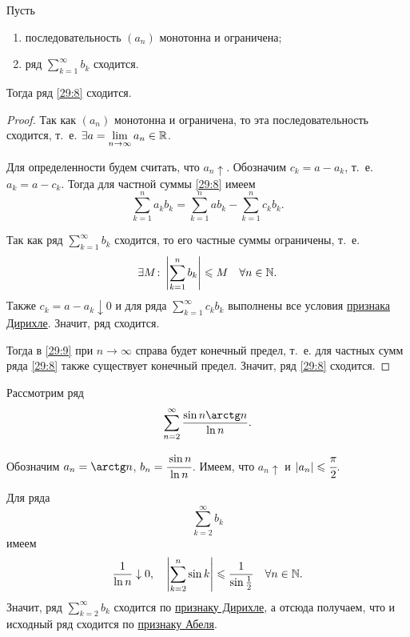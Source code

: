 \documentclass[../../main.tex]{subfiles}
\begin{document}
	\begin{thm}
		\label{29:abel}
		Пусть
		\begin{enumerate}
			\item последовательность $(a_n)$ монотонна и ограничена;
			\item ряд $\sum\limits_{k = 1}^\infty b_k$ сходится.
		\end{enumerate}
	
		Тогда ряд \eqref{29:8} сходится.
	\end{thm}
	\begin{proof}
		Так как $(a_n)$ монотонна и ограничена, то эта последовательность сходится, т.~е. $\exists a = 
		\lim\limits_{n\to\infty} a_n\in \R$.
		
		Для определенности будем считать, что $a_n\uparrow$.
		Обозначим $c_k = a - a_k$, т.~е. $a_k = a - c_k$. 
		Тогда для частной суммы \eqref{29:8} имеем
		\begin{equation}
			\sum_{k = 1}^n a_kb_k = \sum_{k = 1}^n ab_k - \sum_{k = 1}^n c_kb_k.
			\label{29:9}
		\end{equation}
		
		Так как ряд $\sum\limits_{k = 1}^\infty b_k$ сходится, 
		то его частные суммы ограничены, т.~е. 
		\[\exists M\colon \left|\sum\limits_{k = 1}^n b_k\right|\leq M \quad
		\forall n \in \N.\]
		Также $c_k = a - a_k \downarrow 0$ и для ряда
		$\sum\limits_{k = 1}^\infty c_kb_k$
		выполнены все условия \hyperref[29:dirichle]{признака Дирихле}. 
		Значит, ряд сходится.
		
		Тогда в \eqref{29:9} при $n\to\infty$ 
		справа будет конечный предел, т.~е. для частных сумм ряда \eqref{29:8} также существует конечный предел. Значит, ряд \eqref{29:8} сходится.
	\end{proof}
	\begin{example}
		Рассмотрим ряд
		\[\sum_{n = 2}^\infty\frac{\sin n\arctg n}{\ln n}.\]
		
		Обозначим $a_n = \arctg n$, $b_n = \cfrac{\sin n}{\ln n}$. 
		Имеем, что $a_n\uparrow$ и $|a_n|\leq \cfrac{\pi}{2}$.
		
		Для ряда \[\sum_{k = 2}^\infty b_k\] 
		имеем
		\[\frac{1}{\ln n}\downarrow0,\quad \left|\sum_{k = 2}^n \sin k\right|
		\leq \frac{1}{\sin\frac{1}{2}} \quad\forall n \in \N.\]
		Значит, ряд $\sum\limits_{k = 2}^\infty b_k$ сходится по 
		\hyperref[29:dirichle]{признаку Дирихле}, а отсюда получаем, 
		что и исходный ряд сходится по \hyperref[29:abel]{признаку Абеля}.
	\end{example}
\end{document}
